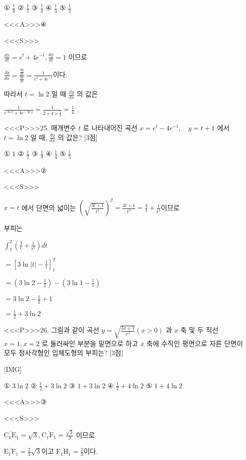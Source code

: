 \documentclass{oblivoir}
\begin{document}
① $\frac{1}{6}$
② $\frac{1}{5}$
③ $\frac{1}{4}$
④ $\frac{1}{3}$
⑤ $\frac{1}{2}$


<<<A>>>④

<<<S>>>



$ \frac{d x}{d t}=e^{t}+4 e^{-t}, \frac{d y}{d t}=1$ 이므로

$\frac{d y}{d x}=\frac{\frac{d y}{d t}}{\frac{d x}{d t}}=\frac{1}{e^{t}+4 e^{-t}}$이다.

따라서 $t=\ln 2$ 일 때 $\frac{d y}{d x}$ 의 값은

$\frac{1}{e^{\ln 2}+4 e^{-\ln 2}}=\frac{1}{2+4 \times \frac{1}{2}}=\frac{1}{4}
$


<<<P>>>25. 매개변수 $t$ 로 나타내어진 곡선
$ x=e^{t}-4 e^{-t}, \quad y=t+1 $
에서 $t=\ln 2$ 일 때, $\frac{d y}{d x}$ 의 값은? [3점]

① $1$
② $\frac{1}{2}$
③ $\frac{1}{3}$
④ $\frac{1}{4}$
⑤ $\frac{1}{5}$



<<<A>>>②

<<<S>>>



$x=t$ 에서 단면의 넓이는
$\left(\sqrt{\frac{3 t+1}{t^{2}}}\right)^{2}=\frac{3 t+1}{t^{2}}=\frac{3}{t}+\frac{1}{t^{2}}$이므로

부피는

$\int_{1}^{2}\left(\frac{3}{t}+\frac{1}{t^{2}}\right) d t $

$=\left[3 \ln |t|-\frac{1}{t}\right]_{1}^{2}$

$=\left(3 \ln 2-\frac{1}{2}\right)-\left(3 \ln 1-\frac{1}{1}\right)$

$=3 \ln 2-\frac{1}{2}+1$

$=\frac{1}{2}+3 \ln 2$


<<<P>>>26. 그림과 같이 곡선 $y=\sqrt{\frac{3 x+1}{x^{2}}}(x>0)$ 과 $x$ 축 및 두 직선 $x=1, x=2$ 로 둘러싸인 부분을 밑면으로 하고 $x$ 축에 수직인 평면으로 자른 단면이 모두 정사각형인 입체도형의 부피는? [3점]

[IMG]

① $3 \ln 2$
② $\frac{1}{2}+3 \ln 2$
③ $1+3 \ln 2$
④ $\frac{1}{2}+4 \ln 2$
⑤ $1+4 \ln 2$



<<<A>>>③

<<<S>>>



$\overline{\mathrm{C}_{1} \mathrm{E}_{1}}=\sqrt{3}, \overline{\mathrm{C}_{1} \mathrm{F}_{1}}=\frac{\sqrt{3}}{3}$ 이므로

$\overline{\mathrm{E}_{1} \mathrm{F}_{1}}=\frac{2}{3} \sqrt{3}$이고 $\overline{\mathrm{F}_{1} \mathrm{H}_{1}}=\frac{2}{3}$이다.
\end{document}
